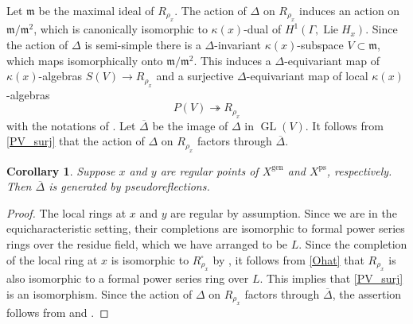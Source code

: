 \documentclass{amsart}
\newtheorem{cor}[prop]{Corollary}
\theoremstyle{definition}
\theoremstyle{remark}
\DeclareMathOperator{\GL}{GL}
\newcommand{\mm}{\mathfrak m}
\newcommand{\gen}{\mathrm{gen}}
\DeclareMathOperator{\Lie}{Lie}
\newcommand{\ps}{\mathrm{ps}}
\begin{document}
Let $\mm$ be the maximal ideal of $R_{\rho_x}$. 
The action of $\Delta$ on $R_{\rho_x}$ induces an action on $\mm/\mm^2$, which is canonically 
isomorphic to $\kappa(x)$-dual of 
$H^1(\Gamma, \Lie H_x)$. Since the action 
of $\Delta$ is semi-simple there is 
a $\Delta$-invariant $\kappa(x)$-subspace
$V\subset \mm$, which maps isomorphically onto $\mm/\mm^2$. This induces a $\Delta$-equivariant map of $\kappa(x)$-algebras $S(V)\rightarrow R_{\rho_x}$ and a surjective $\Delta$-equivariant map of local $\kappa(x)$-algebras
\begin{equation}\label{PV_surj}
P(V)\twoheadrightarrow R_{\rho_x}
\end{equation}
with the notations of . Let $\overline{\Delta}$ be the image of $\Delta$ in $\GL(V)$.
It follows from \eqref{PV_surj} that the action of 
$\Delta$ on $R_{\rho_x}$ factors through $\overline{\Delta}$.

\begin{cor}\label{58} Suppose $x$ and $y$ are regular points of 
$X^{\gen}$ and $X^{\ps}$, respectively. Then
$\overline{\Delta}$ is generated by pseudoreflections.
\end{cor}
\begin{proof} The local rings at $x$ and $y$ are regular by assumption. Since we are in the equicharacteristic 
setting, their 
completions are isomorphic to formal power series rings over the 
residue field, which we have arranged to be $L$. 
Since the completion of the local 
ring at $x$ is isomorphic to $R^{\square}_{\rho_x}$ by \cite[Proposition 5.16]{defG}, it follows from \eqref{Ohat} that 
$R_{\rho_x}$ is also isomorphic to 
a formal power series ring over $L$.
This implies that \eqref{PV_surj} is an isomorphism.
Since the action of $\Delta$
on $R_{\rho_x}$ factors through 
$\overline{\Delta}$, 
the assertion follows from  and .
\end{proof}
\end{document}
